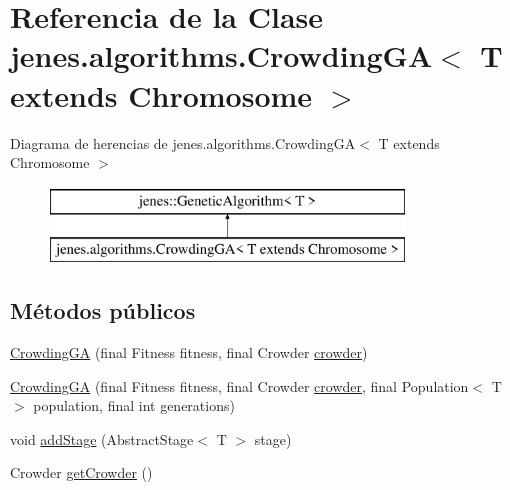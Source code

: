 \hypertarget{classjenes_1_1algorithms_1_1_crowding_g_a_3_01_t_01extends_01_chromosome_01_4}{\section{Referencia de la Clase jenes.\-algorithms.\-Crowding\-G\-A$<$ T extends Chromosome $>$}
\label{classjenes_1_1algorithms_1_1_crowding_g_a_3_01_t_01extends_01_chromosome_01_4}
}
Diagrama de herencias de jenes.\-algorithms.\-Crowding\-G\-A$<$ T extends Chromosome $>$\begin{figure}[H]
\begin{center}
\leavevmode
\includegraphics[height=2.000000cm]{classjenes_1_1algorithms_1_1_crowding_g_a_3_01_t_01extends_01_chromosome_01_4}
\end{center}
\end{figure}
\subsection*{Métodos públicos}
\begin{DoxyCompactItemize}
\item 
\hyperlink{classjenes_1_1algorithms_1_1_crowding_g_a_3_01_t_01extends_01_chromosome_01_4_a5f9de70a8e431de7e0f9bbb6bb42ec1e}{Crowding\-G\-A} (final Fitness fitness, final Crowder \hyperlink{classjenes_1_1algorithms_1_1_crowding_g_a_3_01_t_01extends_01_chromosome_01_4_aa747112afbb20cb4faec643ccc73e396}{crowder})
\item 
\hyperlink{classjenes_1_1algorithms_1_1_crowding_g_a_3_01_t_01extends_01_chromosome_01_4_ad3e5e26f962e7839e076b61efcd5704f}{Crowding\-G\-A} (final Fitness fitness, final Crowder \hyperlink{classjenes_1_1algorithms_1_1_crowding_g_a_3_01_t_01extends_01_chromosome_01_4_aa747112afbb20cb4faec643ccc73e396}{crowder}, final Population$<$ T $>$ population, final int generations)
\item 
void \hyperlink{classjenes_1_1algorithms_1_1_crowding_g_a_3_01_t_01extends_01_chromosome_01_4_ad241412becfe0073cbeb06418a1e49f3}{add\-Stage} (Abstract\-Stage$<$ T $>$ stage)
\item 
Crowder \hyperlink{classjenes_1_1algorithms_1_1_crowding_g_a_3_01_t_01extends_01_chromosome_01_4_a6cc270cedf906a0743cb743b30c2ba02}{get\-Crowder} ()
\end{DoxyCompactItemize}
